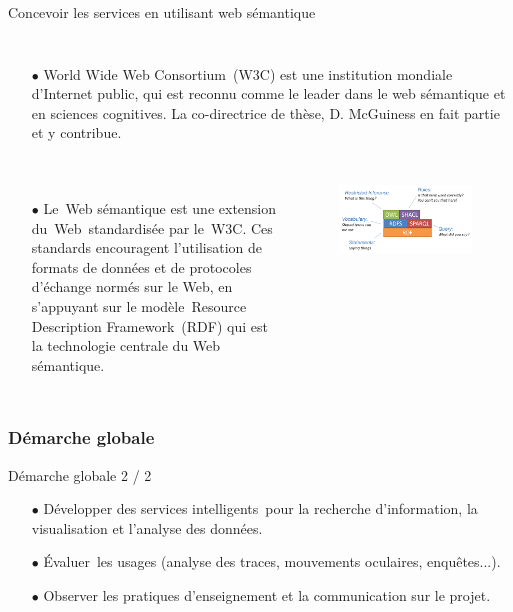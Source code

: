 \documentclass[xcolor=dvipsnames]{beamer}
\begin{document}
\begin{frame}{Concevoir les services en utilisant web sémantique}
\begin{columns}
	\begin{itemize}
	\item[$\bullet$] World Wide Web Consortium (W3C) est une institution mondiale d’Internet public, qui est reconnu comme le leader dans le web sémantique et en sciences cognitives. La co-directrice de thèse, D. McGuiness en fait partie et y contribue. 
	\end{itemize}
\end{columns}
	\begin{columns}
	\begin{itemize}
		\item[$\bullet$] Le Web sémantique est une extension du Web standardisée par le W3C. Ces standards encouragent l'utilisation de formats de données et de protocoles d'échange normés sur le Web, en s'appuyant sur le modèle Resource Description Framework (RDF) qui est la technologie centrale du Web sémantique. 
	\end{itemize}
	\begin{figure}[ht]
		\begin{center}
			\includegraphics[width=\textwidth]{./images/Semantic_Web.png}
		\end{center}
	\end{figure}
\end{columns}
\end{frame}

\begin{frame}[fragile]
\frametitle{Démarche globale}
\begin{block}{Démarche globale 2 / 2}
	\begin{itemize}
		\item[$\bullet$] Développer des services intelligents pour la recherche d'information, la visualisation et l’analyse des données.
		\item[$\bullet$] Évaluer les usages (analyse des traces, mouvements oculaires, enquêtes...).
		\item[$\bullet$] Observer les pratiques d'enseignement et la communication sur le projet.
	\end{itemize}
\end{block}
\end{frame}
\end{document}
